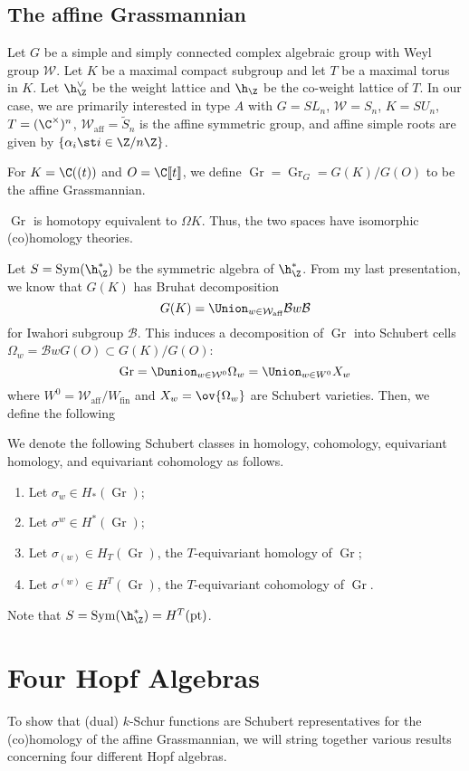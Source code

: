 \documentclass[11pt,leqno,oneside]{amsart}
\numberwithin{thm}{section}
\renewcommand{\W}{\mathcal{W}}
\newcommand{\Waff}{\W_{\text{aff}}}
\newcommand{\eS}{\tilde{S}}
\newcommand{\Gr}{\operatorname{Gr}}
\newcommand{\Bc}{\mathcal{B}}
\begin{document}
\subsection{The affine Grassmannian}
Let \(G\) be a simple and simply connected complex algebraic group
with Weyl group \(\W\). Let \(K\) be a maximal compact subgroup and
let \(T\) be a maximal torus in \(K\). Let \(\h_\Z^\vee\) be the
weight lattice and \(\h_\Z\) be the co-weight lattice of \(T\). In our
case, we are primarily interested in type \(A\) with \(G = SL_n\), \(\W = S_n\), \(K =
SU_n\), \(T = (\C^\times)^n\), \(\Waff = \eS_n\) is the affine symmetric group, and
affine simple roots are given by \(\{\alpha_i \st i \in \Z/n\Z\}\).

For \(K = \C((t))\) and \(O = \C \llbracket t \rrbracket\), we define
\(\Gr = \Gr_G = G(K)/G(O)\) to be the affine Grassmannian.
\begin{prop}
 \(\Gr\) is homotopy equivalent to \(\Omega K\). Thus, the two spaces
 have isomorphic (co)homology theories.
\end{prop}
Let \(S = \operatorname{Sym}(\h_\Z^*)\) be the
symmetric algebra of \(\h^*_\Z\). From my last presentation, we know
that \(G(K)\) has Bruhat decomposition \[
  G(K) = \Union_{w \in \Waff} \Bc w \Bc
\]
for Iwahori subgroup \(\Bc\). This induces a decomposition of \(\Gr\)
into Schubert cells \(\Omega_w = \Bc w G(O) \subset G(K)/G(O)\): \[
  \Gr = \Dunion_{w \in \W^0} \Omega_w = \Union_{w \in W^0} X_w
\]
where \(W^0 = \Waff/W_{\text{fin}}\) and \(X_w = \ov{\Omega_w}\) are
Schubert varieties. Then, we define the following
\begin{defn}
  We denote the following Schubert classes in homology, cohomology,
  equivariant homology, and equivariant cohomology as follows.
  \begin{enumerate}
  \item Let \(\sigma_w \in H_*(\Gr)\);
  \item Let \(\sigma^w \in H^*(\Gr)\);
  \item Let \(\sigma_{(w)} \in H_T(\Gr)\), the \(T\)-equivariant
    homology of \(\Gr\);
  \item Let \(\sigma^{(w)} \in H^T(\Gr)\), the \(T\)-equivariant
    cohomology of \(\Gr\).
  \end{enumerate}
\end{defn}
\begin{rmk}
  Note that \(S = \operatorname{Sym}(\h_\Z^*) = H^T(\text{pt})\).
\end{rmk}
\section{Four Hopf Algebras}
To show that (dual) \(k\)-Schur functions are Schubert representatives for
the (co)homology of the affine Grassmannian, we will string together
various results concerning four different Hopf algebras.
\end{document}
